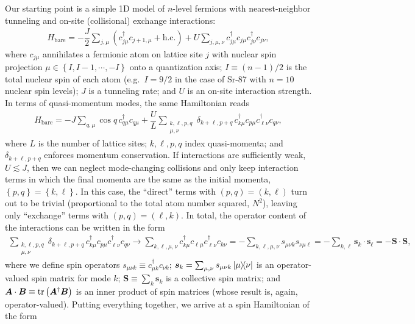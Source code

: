 \documentclass[nofootinbib,notitlepage,11pt]{revtex4-2}
\renewcommand{\t}{\text} %
\newcommand{\f}[2]{\dfrac{#1}{#2}} %
\newcommand{\p}[1]{\left(#1\right)} %
\renewcommand{\set}[1]{\left\{#1\right\}} %
\renewcommand{\v}{\bm} %
\renewcommand{\c}{\cdot} %
\newcommand{\1}{\mathds{1}}
\begin{document}
Our starting point is a simple 1D model of $n$-level fermions with nearest-neighbor tunneling and on-site (collisional) exchange interactions:
\begin{align}
  H_{\t{bare}} = -\f{J}{2} \sum_{j,\mu}
  \p{c_{j\mu}^\dag c_{j+1,\mu} + \t{h.c.}}
  + U \sum_{j,\mu,\nu} c_{j\mu}^\dag c_{j\mu} c_{j\nu}^\dag c_{j\nu},
  \label{eq:bare_sites}
\end{align}
where $c_{j\mu}$ annihilates a fermionic atom on lattice site $j$ with nuclear spin projection $\mu\in\set{I,I-1,\cdots,-I}$ onto a quantization axis; $I\equiv\p{n-1}/2$ is the total nuclear spin of each atom (e.g.~$I=9/2$ in the case of Sr-87 with $n=10$ nuclear spin levels); $J$ is a tunneling rate; and $U$ is an on-site interaction strength.
In terms of quasi-momentum modes, the same Hamiltonian reads
\begin{align}
  H_{\t{bare}} = -J \sum_{q,\mu} \cos q\, c_{q\mu}^\dag c_{q\mu}
  + \f{U}{L} \sum_{\substack{k,\ell,p,q\\\mu,\nu}}
  \delta_{k+\ell,p+q}\, c_{k\mu}^\dag c_{p\mu} c_{\ell\nu}^\dag c_{q\nu},
  \label{eq:bare_momenta}
\end{align}
where $L$ is the number of lattice sites; $k,\ell,p,q$ index quasi-momenta; and $\delta_{k+\ell,p+q}$ enforces momentum conservation.
If interactions are sufficiently weak, $U\lesssim J$, then we can neglect mode-changing collisions and only keep interaction terms in which the final momenta are the same as the initial momenta, $\set{p,q}=\set{k,\ell}$.
In this case, the ``direct'' terms with $\p{p,q}=\p{k,\ell}$ turn out to be trivial (proportional to the total atom number squared, $N^2$), leaving only ``exchange'' terms with $\p{p,q}=\p{\ell,k}$. In total, the operator content of the interactions can be written in the form
\begin{align}
  \sum_{\substack{k,\ell,p,q\\\mu,\nu}}
  \delta_{k+\ell,p+q}\, c_{k\mu}^\dag c_{p\mu} c_{\ell\nu}^\dag c_{q\nu}
  \to \sum_{k,\ell,\mu,\nu} c_{k\mu}^\dag c_{\ell\mu}
  c_{\ell\nu}^\dag c_{k\nu}
  = -\sum_{k,\ell,\mu,\nu} s_{\mu\nu k} s_{\nu\mu\ell}
  = -\sum_{k,\ell} \v s_k \c\v s_\ell
  = -\v S \c\v S,
\end{align}
where we define spin operators $s_{\mu\nu k}\equiv c_{\mu k}^\dag c_{\nu k}$; $\v s_k=\sum_{\mu,\nu}s_{\mu\nu k}\op{\mu}{\nu}$ is an operator-valued spin matrix for mode $k$; $\v S\equiv\sum_k \v s_k$ is a collective spin matrix; and $\v A\c\v B\equiv\tr\p{\v A^\dag \v B}$ is an inner product of spin matrices (whose result is, again, operator-valued).  Putting everything together, we arrive at a spin Hamiltonian of the form
\end{document}
